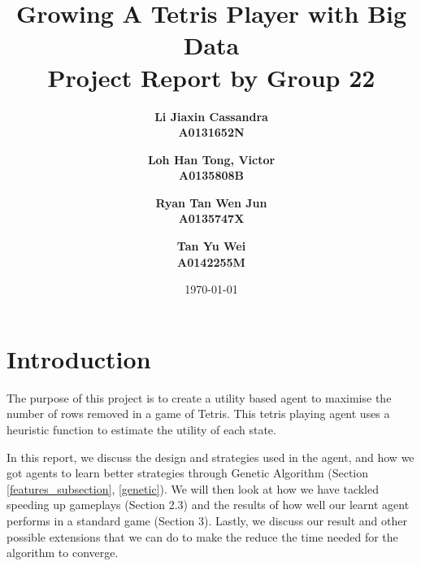 \documentclass[a4paper,12pt,twocolumn]{article}
\begin{document}

\title{
    Growing A Tetris Player with Big Data\\
    \large Project Report by Group 22
}
\author{
    \bf{Li Jiaxin Cassandra}\\ 
    A0131652N
    \and
    \bf{Loh Han Tong, Victor}\\
    A0135808B
    \and
    \bf{Ryan Tan Wen Jun}\\
    A0135747X
    \and
    \bf{Tan Yu Wei}\\
    A0142255M
}
\date{\today}
\maketitle

\section{Introduction}
The purpose of this project is to create a utility based agent to maximise the
number of rows removed in a game of Tetris. This tetris playing agent uses a heuristic
function to estimate the utility of each state.

In this report, we discuss the design and strategies used in the agent, and how we got
agents to learn better strategies through Genetic Algorithm (Section \ref{features_subsection}, \ref{genetic}).
We will then look at how we have tackled speeding up gameplays (Section 2.3) and the
results of how well our learnt agent performs in a standard game (Section 3). Lastly,
we discuss our result and other possible extensions that we can do to make the reduce
the time needed for the algorithm to converge.


\end{document}
